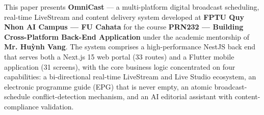 {This paper presents \textbf{OmniCast} --- a multi-platform digital
broadcast scheduling, real-time LiveStream and content delivery system developed at \textbf{FPTU Quy Nhon AI Campus --- FU Cahata} for the course
\textbf{PRN232 --- Building Cross-Platform Back-End Application} under the academic mentorship of \textbf{Mr. Huỳnh Vang}. The
system comprises a high-performance NestJS back end that serves both a
Next.js 15 web portal (33 routes) and a Flutter mobile application (31 screens), with the core
business logic concentrated on four capabilities: a bi-directional real-time LiveStream and Live Studio ecosystem, an electronic
programme guide (EPG) that is never empty, an atomic broadcast-schedule
conflict-detection mechanism, and an AI editorial assistant with
content-compliance validation.
}

\subsection{}


